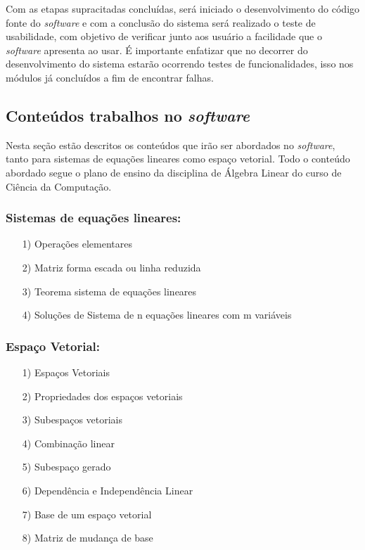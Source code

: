 Com as etapas supracitadas concluídas, será iniciado o desenvolvimento do código fonte do \textit{software} e com a conclusão do sistema será realizado o teste de usabilidade, com objetivo de verificar junto aos usuário a facilidade que o \textit{software} apresenta ao usar. É importante enfatizar que no decorrer do desenvolvimento do sistema estarão ocorrendo testes de funcionalidades, isso nos módulos já concluídos a fim de encontrar falhas.

\subsection{Conteúdos trabalhos no \textit{software}}
\noindent Nesta seção estão descritos os conteúdos que irão ser abordados no \textit{software}, tanto para sistemas de equações lineares como espaço vetorial. Todo o conteúdo abordado segue o plano de ensino da disciplina de Álgebra Linear do curso de Ciência da Computação.  

\subsubsection{Sistemas de equações lineares:}
\begin{itemize}
    \item[1)] Operações elementares
    \item[2)] Matriz forma escada ou linha reduzida
    \item[3)] Teorema sistema de equações lineares
    \item[4)] Soluções de Sistema de n equações lineares com m variáveis
\end{itemize}

\subsubsection{Espaço Vetorial:} 
\begin{itemize}
    \item[1)] Espaços Vetoriais
    \item[2)] Propriedades dos espaços vetoriais
    \item[3)] Subespaços vetoriais
    \item[4)] Combinação linear
    \item[5)] Subespaço gerado
    \item[6)] Dependência e Independência Linear
    \item[7)] Base de um espaço vetorial
    \item[8)] Matriz de mudança de base
\end{itemize}

